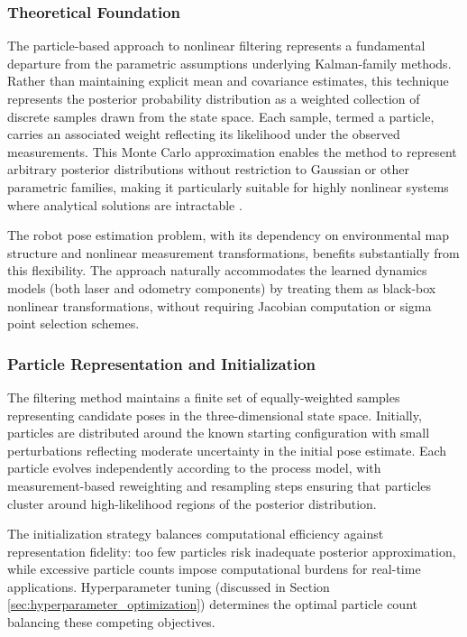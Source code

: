 \documentclass[conference]{IEEEtran}
\begin{document}
\subsubsection{Theoretical Foundation}

The particle-based approach to nonlinear filtering represents a fundamental departure from the parametric assumptions underlying Kalman-family methods. Rather than maintaining explicit mean and covariance estimates, this technique represents the posterior probability distribution as a weighted collection of discrete samples drawn from the state space. Each sample, termed a particle, carries an associated weight reflecting its likelihood under the observed measurements. This Monte Carlo approximation enables the method to represent arbitrary posterior distributions without restriction to Gaussian or other parametric families, making it particularly suitable for highly nonlinear systems where analytical solutions are intractable \cite{Elfring2021}.

The robot pose estimation problem, with its dependency on environmental map structure and nonlinear measurement transformations, benefits substantially from this flexibility. The approach naturally accommodates the learned dynamics models (both laser and odometry components) by treating them as black-box nonlinear transformations, without requiring Jacobian computation or sigma point selection schemes.

\subsubsection{Particle Representation and Initialization}

The filtering method maintains a finite set of equally-weighted samples representing candidate poses in the three-dimensional state space. Initially, particles are distributed around the known starting configuration with small perturbations reflecting moderate uncertainty in the initial pose estimate. Each particle evolves independently according to the process model, with measurement-based reweighting and resampling steps ensuring that particles cluster around high-likelihood regions of the posterior distribution.

The initialization strategy balances computational efficiency against representation fidelity: too few particles risk inadequate posterior approximation, while excessive particle counts impose computational burdens for real-time applications. Hyperparameter tuning (discussed in Section \ref{sec:hyperparameter_optimization}) determines the optimal particle count balancing these competing objectives.
\end{document}
